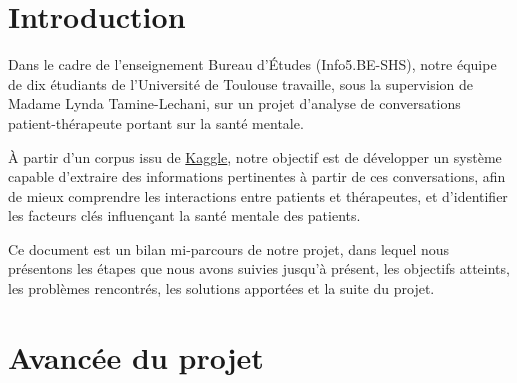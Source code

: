 \documentclass[12pt,a4paper]{article}
\begin{document}
\tableofcontents
\newpage

\section{Introduction}
Dans le cadre de l'enseignement Bureau d'Études (Info5.BE-SHS), notre équipe de dix étudiants de l'Université de Toulouse
travaille, sous la supervision de Madame Lynda Tamine-Lechani, sur un projet d'analyse de conversations patient-thérapeute portant sur la santé mentale.   

À partir d'un corpus issu de \href{https://www.kaggle.com/datasets/thedevastator/nlp-mental-health-conversations}{Kaggle}, 
notre objectif est de développer un système capable d'extraire des informations pertinentes à partir de ces conversations, 
afin de mieux comprendre les interactions entre patients et thérapeutes, et d'identifier les facteurs clés influençant la santé mentale des patients.

Ce document est un bilan mi-parcours de notre projet, dans lequel nous présentons les étapes que nous avons suivies jusqu'à présent,
les objectifs atteints, les problèmes rencontrés, les solutions apportées et la suite du projet.
\pagebreak


\section{Avancée du projet}
\end{document}
